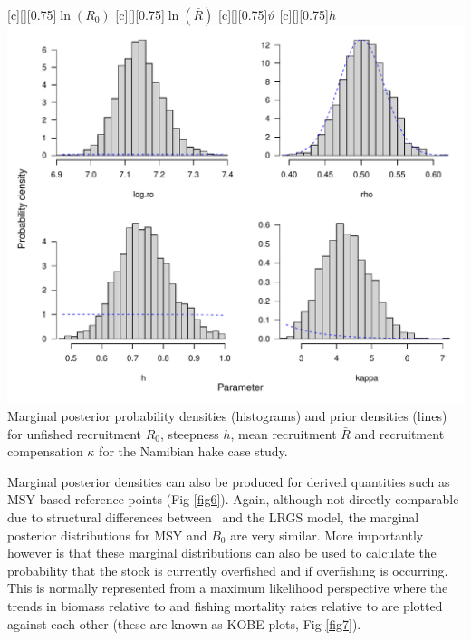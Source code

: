 \begin{multicols}{2}
\begin{figurehere}
	\centering
	[][0.75]{$\ln(R_0)$}
	[][0.75]{$\ln(\bar{R})$}
	[][0.75]{$\vartheta$}
	[][0.75]{$h$}
	\includegraphics[width=\columnwidth]{iscamFigs/nHakeparameters.pdf}\\
	\caption{Marginal posterior probability densities (histograms) and prior densities (lines) for unfished recruitment $R_0$, steepness $h$, mean recruitment $\bar{R}$ and recruitment compensation $\kappa$ for the Namibian hake case study.}\label{fig5}
\end{figurehere}

Marginal posterior densities can also be produced for derived quantities such as MSY based reference points (Fig \ref{fig6}).   Again, although not directly comparable due to structural differences between \iscam\ and the LRGS model, the marginal posterior distributions for MSY and $B_0$ are very similar.  More importantly however is that these marginal distributions can also be used to calculate the probability that the stock is currently overfished and if overfishing is occurring.  This is normally represented from a maximum likelihood perspective where the trends in biomass relative to \bmsy and fishing mortality rates relative to \fmsy are plotted against each other (these are known as KOBE plots, Fig \ref{fig7}).


\end{multicols}
